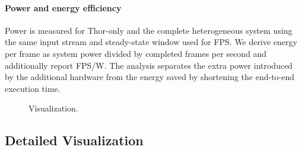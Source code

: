 \paragraph{Power and energy efficiency}
Power is measured for Thor-only and the complete heterogeneous system using
the same input stream and steady-state window used for FPS.  We derive energy
per frame as system power divided by completed frames per second and
additionally report FPS/W.  The analysis separates the extra power introduced
by the additional hardware from the energy saved by shortening the end-to-end
execution time.

\begin{figure}[t]
  \centering
  \caption{Visualization. \pending}
  \label{fig:visualization}
\end{figure}

\newpage

\subsection{Detailed Visualization}
\label{sec:visualization}

